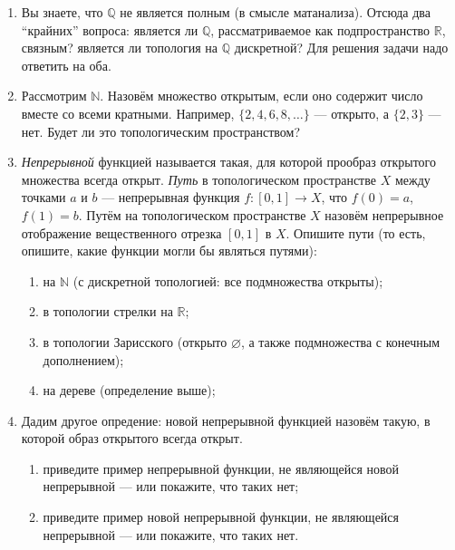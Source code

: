\documentclass[10pt,a4paper,oneside]{article}
\begin{document}
\begin{enumerate}
\begin{enumerate}
\item Постройте примеры связного пространства, в котором есть $A,B$, нарушающие только одно из свойств 
(приведите по примеру на каждое свойство).

\item Покажите, что топология на дереве из задания выше задаёт связное пространство.
\end{enumerate}

\item Вы знаете, что $\mathbb{Q}$ не является полным (в смысле матанализа). Отсюда два ``крайних'' вопроса:
является ли $\mathbb{Q}$, рассматриваемое как подпространство $\mathbb{R}$, связным?
является ли топология на $\mathbb{Q}$ дискретной?
Для решения задачи надо ответить на оба.

\item Рассмотрим $\mathbb{N}$. Назовём множество открытым, если оно содержит число вместе
со всеми кратными. Например, $\{2,4,6,8,\dots\}$ --- открыто, а $\{2,3\}$ --- нет.
Будет ли это топологическим пространством?

\item \emph{Непрерывной} функцией называется такая, для которой прообраз открытого множества всегда открыт.
\emph{Путь} в топологическом пространстве $X$ между точками $a$ и $b$ --- непрерывная функция $f: [0,1] \rightarrow X$,
что $f(0) = a$, $f(1) = b$.
Путём на топологическом пространстве $X$ назовём непрерывное отображение вещественного отрезка $[0,1]$ в $X$.
Опишите пути (то есть, опишите, какие функции могли бы являться путями):
\begin{enumerate}
\item на $\mathbb{N}$ (с дискретной топологией: все подмножества открыты);
\item в топологии стрелки на $\mathbb{R}$;
\item в топологии Зарисского (открыто $\varnothing$, а также подмножества с конечным дополнением);
\item на дереве (определение выше);
\end{enumerate}

\item Дадим другое опредение: новой непрерывной функцией назовём такую, в которой образ открытого всегда открыт.
\begin{enumerate}
\item приведите пример непрерывной функции, не являющейся новой непрерывной --- или покажите, что таких нет;
\item приведите пример новой непрерывной функции, не являющейся непрерывной --- или покажите, что таких нет.
\end{enumerate}


\end{enumerate}
\end{document}
